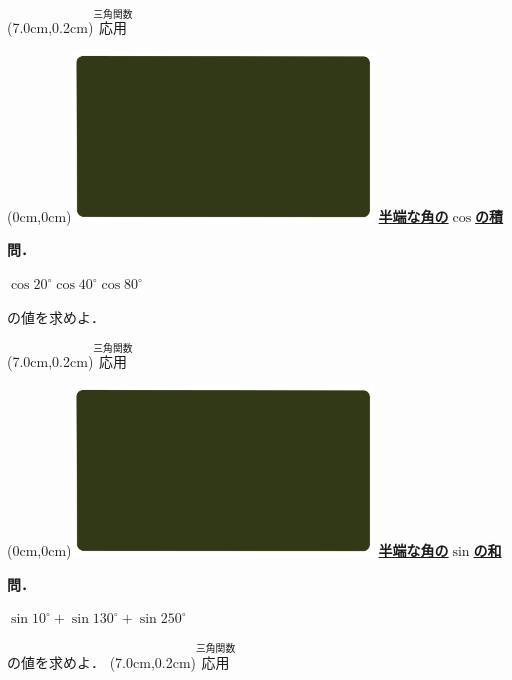 \documentclass[10pt,
fleqn,
dvipdfmx,
uplatex
]{jsarticle}
\begin{document}
\at(7.0cm,0.2cm){\small\color{bradorange}$\overset{\text{三角関数}}{\text{応用}}$}


\newpage



\at(0cm,0cm){\includegraphics[width=8cm,bb=0 0 1920 1080]{./youtube/thumbnails/templates/smart_background/三角関数.jpeg}}
{\color{orange}\bf\boldmath\LARGE\underline{半端な角の$\cos$の積}}\vspace{0.3zw}

\Large
\bf\boldmath 問．

\LARGE
\hspace{1zw}$\cos {20}^\circ \cos {40}^\circ \cos {80}^\circ$\vspace{0.5zw}

\Large
\hfill の値を求めよ．

\at(7.0cm,0.2cm){\small\color{bradorange}$\overset{\text{三角関数}}{\text{応用}}$}


\newpage



\at(0cm,0cm){\includegraphics[width=8cm,bb=0 0 1920 1080]{./youtube/thumbnails/templates/smart_background/三角関数.jpeg}}
{\color{orange}\bf\boldmath\LARGE\underline{半端な角の$\sin$の和}}\vspace{0.3zw}


\Large
\bf\boldmath 問．

\LARGE
\hspace{0.2zw}$\sin {10}^\circ +\sin {130}^\circ +\sin {250}^\circ$\vspace{0.5zw}

\Large
\hfill の値を求めよ．
\at(7.0cm,0.2cm){\small\color{bradorange}$\overset{\text{三角関数}}{\text{応用}}$}
\end{document}

